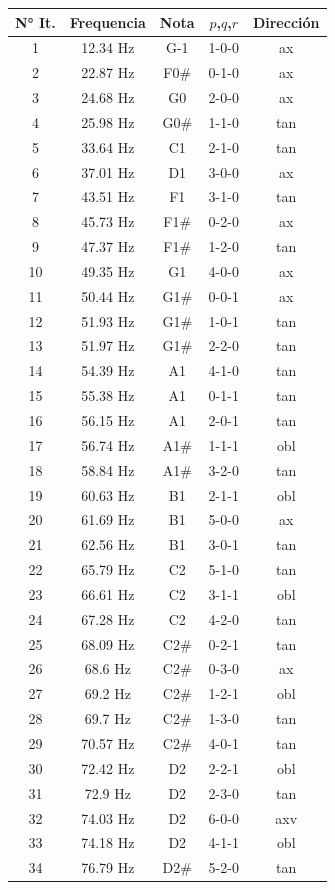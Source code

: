 \begin{table}[H]
\setlength\arrayrulewidth{1pt}
    \centering
    \begin{tabular}{|c|c|c|c|c|}
    \hline
N° It. & Frequencia & Nota & $p$,$q$,$r$ & Dirección \\
\hline \hline
1&12.34 Hz&G-1&1-0-0&ax  \\
2&22.87 Hz&F0\#&0-1-0&ax\\
3&24.68 Hz&G0&2-0-0&ax\\
4&25.98 Hz&G0\#&1-1-0&tan\\
5&33.64 Hz&C1&2-1-0&tan\\
6&37.01 Hz&D1&3-0-0&ax\\
7&43.51 Hz&F1&3-1-0&tan\\
8&45.73 Hz&F1\#&0-2-0&ax\\
9&47.37 Hz&F1\#&1-2-0&tan\\
10&49.35 Hz&G1&4-0-0&ax\\
11&50.44 Hz&G1\#&0-0-1&ax\\
12&51.93 Hz&G1\#&1-0-1&tan\\
13&51.97 Hz&G1\#&2-2-0&tan\\
14&54.39 Hz&A1&4-1-0&tan\\
15&55.38 Hz&A1&0-1-1&tan\\
16&56.15 Hz&A1&2-0-1&tan\\
17&56.74 Hz&A1\#&1-1-1&obl\\
18&58.84 Hz&A1\#&3-2-0&tan\\
19&60.63 Hz&B1&2-1-1&obl\\
20&61.69 Hz&B1&5-0-0&ax\\
21&62.56 Hz&B1&3-0-1&tan\\
22&65.79 Hz&C2&5-1-0&tan\\
23&66.61 Hz&C2&3-1-1&obl\\
24&67.28 Hz&C2&4-2-0&tan\\
25&68.09 Hz&C2\#&0-2-1&tan\\
26&68.6 Hz&C2\#&0-3-0&ax\\
27&69.2 Hz&C2\#&1-2-1&obl\\
28&69.7 Hz&C2\#&1-3-0&tan\\
29&70.57 Hz&C2\#&4-0-1&tan\\
30&72.42 Hz&D2&2-2-1&obl\\
31&72.9 Hz&D2&2-3-0&tan\\
32&74.03 Hz&D2&6-0-0&axv\\
33&74.18 Hz&D2&4-1-1&obl\\
34&76.79 Hz&D2\#&5-2-0&tan\\

\end{tabular}
\end{table}
